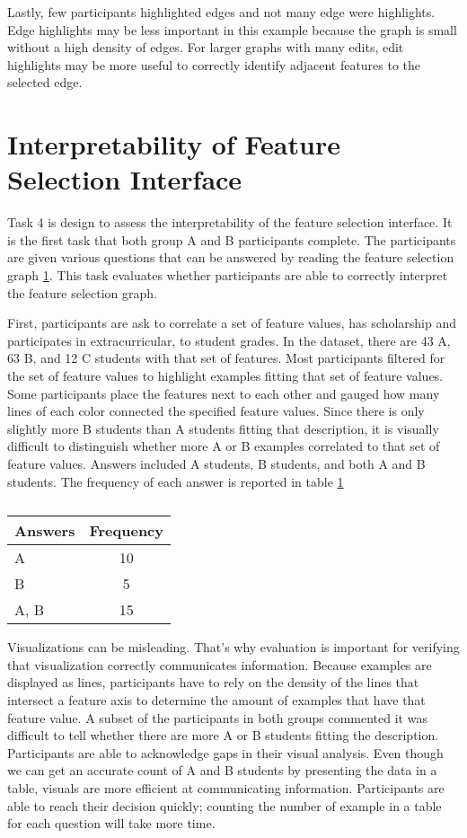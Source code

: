 Lastly, few participants highlighted edges and not many edge were highlights. Edge highlights may be less important in this example because the graph is small without a high density of edges. For larger graphs with many edits, edit highlights may be more useful to correctly identify adjacent features to the selected edge.

\section { Interpretability of Feature Selection Interface }
Task 4 is design to assess the interpretability of the feature selection interface. It is the first task that both group A and B participants complete. The participants are given various questions that can be answered by reading the feature selection graph \ref{}. This task evaluates whether participants are able to correctly interpret the feature selection graph.

First, participants are ask to correlate a set of feature values, has scholarship and participates in extracurricular, to student grades. In the dataset, there are 43 A, 63 B, and 12 C students with that set of features. Most participants filtered for the set of feature values to highlight examples fitting that set of feature values. Some participants place the features next to each other and gauged how many lines of each color connected the specified feature values. Since there is only slightly more B students than A students fitting that description, it is visually difficult to distinguish whether more A or B examples correlated to that set of feature values. Answers included A students, B students, and both A and B students. The frequency of each answer is reported in table \ref{InterpretFS1}

\begin{table}[]
\centering
\begin{tabular}{lc}
\hline
Answers & Frequency \\ \hline
A       & 10        \\
B       & 5         \\
A, B    & 15        \\ \hline
\end{tabular}
\caption{}
\label{InterpretFS1}
\end{table}

Visualizations can be misleading. That's why evaluation is important for verifying that visualization correctly communicates information. Because examples are displayed as lines, participants have to rely on the density of the lines that intersect a feature axis to determine the amount of examples that have that feature value. A subset of the participants in both groups commented it was difficult to tell whether there are more A or B students fitting the description. Participants are able to acknowledge gaps in their visual analysis. Even though we can get an accurate count of A and B students by presenting the data in a table, visuals are more efficient at communicating information. Participants are able to reach their decision quickly; counting the number of example in a table for each question will take more time.


